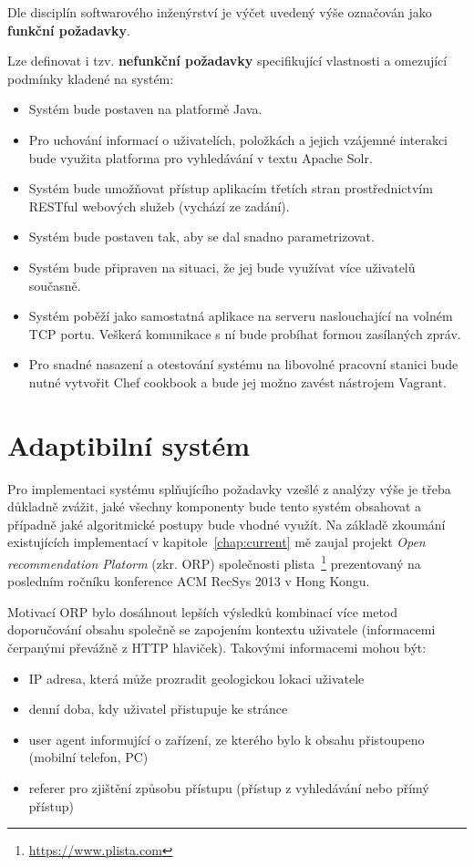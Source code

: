 \documentclass[thesis=M,czech]{FITthesis}[2014/05/07]
\begin{document}
Dle disciplín softwarového inženýrství je výčet uvedený výše označován jako \textbf{funkční požadavky}.

Lze definovat i tzv. \textbf{nefunkční požadavky} specifikující vlastnosti a omezující podmínky kladené na systém:

\begin{itemize}
	\item Systém bude postaven na platformě Java.
	\item Pro uchování informací o uživatelích, položkách a jejich vzájemné interakci bude využita platforma pro vyhledávání v textu Apache Solr.
	\item Systém bude umožňovat přístup aplikacím třetích stran prostřednictvím RESTful webových služeb (vychází ze zadání).
	\item Systém bude postaven tak, aby se dal snadno parametrizovat. 
	\item Systém bude připraven na situaci, že jej bude využívat více uživatelů současně.
	\item Systém poběží jako samostatná aplikace na serveru naslouchající na volném TCP portu. Veškerá komunikace s ní bude probíhat formou zasílaných zpráv.
	\item Pro snadné nasazení a otestování systému na libovolné pracovní stanici bude nutné vytvořit Chef cookbook a bude jej možno zavést nástrojem Vagrant.
\end{itemize}

\section{Adaptibilní systém}

Pro implementaci systému splňujícího požadavky vzešlé z analýzy výše je třeba důkladně zvážit, jaké všechny komponenty bude tento systém obsahovat a případně jaké algoritmické postupy bude vhodné využít. Na základě zkoumání existujících implementací v kapitole~\ref{chap:current} mě zaujal projekt \emph{Open recommendation Platorm} (zkr. ORP) společnosti plista~\footnote{\url{https://www.plista.com}} prezentovaný na posledním ročníku konference ACM RecSys 2013 v Hong Kongu. 

Motivací ORP bylo dosáhnout lepších výsledků kombinací více metod doporučování obsahu společně se zapojením kontextu uživatele (informacemi čerpanými převážně z HTTP hlaviček). Takovými informacemi mohou být:

\begin{itemize}
	\item IP adresa, která může prozradit geologickou lokaci uživatele
	\item denní doba, kdy uživatel přistupuje ke stránce
	\item user agent informující o zařízení, ze kterého bylo k obsahu přistoupeno (mobilní telefon, PC)
	\item referer pro zjištění způsobu přístupu (přístup z vyhledávání nebo přímý přístup) 
\end{itemize}
\end{document}
